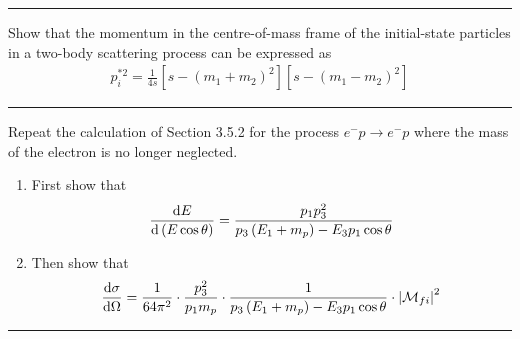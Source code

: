 \noindent\rule{7in}{1.5pt}
    

\begin{problem}{3.9}
Show that the momentum in the centre-of-mass frame of the initial-state particles in a two-body scattering
process can be expressed as
\begin{align*}
    p_i^{\ast 2} = \frac{1}{4s} \left[ s-\left(m_1+m_2\right)^2 \right]\left[ s-\left(m_1-m_2\right)^2 \right]
\end{align*}
\end{problem}
\begin{solution}

\end{solution}

\noindent\rule{7in}{1.5pt}


\begin{problem}{3.10}
Repeat the calculation of Section 3.5.2 for the process $e^-p \to e^-p$ where the mass of the electron is no longer neglected.
\begin{enumerate}[label=(\alph*)]
    \item First show that
    \begin{align*}
        \frac{\mathop{}\!\mathrm{d} E}{\mathop{}\!\mathrm{d} \left( E \cos\theta \right)} = \frac{p_1p_3^2}{p_3\left(E_1+m_p\right)-E_3p_1\cos\theta}
    \end{align*}
    \item Then show that
    \begin{align*}
        \frac{\mathop{}\!\mathrm{d} \sigma}{\mathop{}\!\mathrm{d} \Omega} = \frac{1}{64\pi^2} \cdot \frac{p_3^2}{p_1m_p} \cdot \frac{1}{p_3\left(E_1+m_p\right)-E_3p_1\cos\theta} \cdot \left| \mathcal{M}_{fi} \right|^2
    \end{align*}
\end{enumerate}
\end{problem}
\begin{solution}

\end{solution}

\noindent\rule{7in}{1.5pt}

